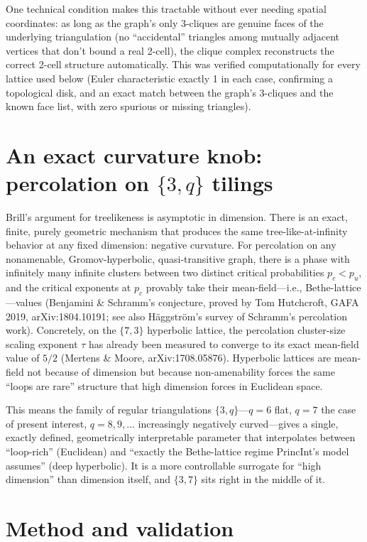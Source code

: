 \documentclass[11pt]{article}
\begin{document}
One technical condition makes this tractable without ever needing spatial coordinates: as long as the graph's only 3-cliques are genuine faces of the underlying triangulation (no ``accidental'' triangles among mutually adjacent vertices that don't bound a real 2-cell), the clique complex reconstructs the correct 2-cell structure automatically. This was verified computationally for every lattice used below (Euler characteristic exactly 1 in each case, confirming a topological disk, and an exact match between the graph's 3-cliques and the known face list, with zero spurious or missing triangles).

\section{An exact curvature knob: percolation on $\{3,q\}$ tilings}

Brill's argument for treelikeness is asymptotic in dimension. There is an exact, finite, purely geometric mechanism that produces the same tree-like-at-infinity behavior at any fixed dimension: negative curvature. For percolation on any nonamenable, Gromov-hyperbolic, quasi-transitive graph, there is a phase with infinitely many infinite clusters between two distinct critical probabilities $p_c < p_u$, and the critical exponents at $p_c$ provably take their mean-field---i.e., Bethe-lattice---values (Benjamini \& Schramm's conjecture, proved by Tom Hutchcroft, GAFA 2019, arXiv:1804.10191; see also H\"aggstr\"om's survey of Schramm's percolation work). Concretely, on the $\{7,3\}$ hyperbolic lattice, the percolation cluster-size scaling exponent $\tau$ has already been measured to converge to its exact mean-field value of $5/2$ (Mertens \& Moore, arXiv:1708.05876). Hyperbolic lattices are mean-field not because of dimension but because non-amenability forces the same ``loops are rare'' structure that high dimension forces in Euclidean space.

This means the family of regular triangulations $\{3,q\}$---$q = 6$ flat, $q = 7$ the case of present interest, $q = 8, 9, \ldots$ increasingly negatively curved---gives a single, exactly defined, geometrically interpretable parameter that interpolates between ``loop-rich'' (Euclidean) and ``exactly the Bethe-lattice regime PrincInt's model assumes'' (deep hyperbolic). It is a more controllable surrogate for ``high dimension'' than dimension itself, and $\{3,7\}$ sits right in the middle of it.

\section{Method and validation}
\end{document}
